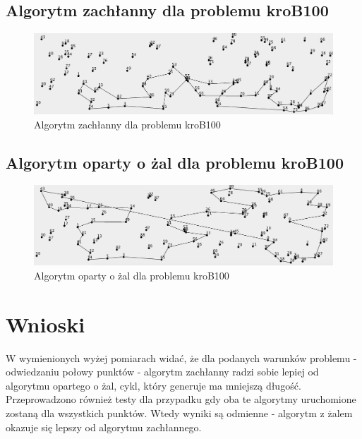 \documentclass[a4paper]{article}
\begin{document}
\subsection{Algorytm zachłanny dla problemu kroB100}

\begin{figure}[H]
\centering
\includegraphics[width=\textwidth]{kroB_greedy}
\caption{Algorytm zachłanny dla problemu kroB100}
\end{figure}

\subsection{Algorytm oparty o żal dla problemu kroB100}

\begin{figure}[H]
\centering
\includegraphics[width=\textwidth]{kroB_regret}
\caption{Algorytm oparty o żal dla problemu kroB100}
\end{figure}

\section{Wnioski}

W wymienionych wyżej pomiarach widać, że dla podanych warunków problemu -  odwiedzaniu połowy punktów - algorytm zachłanny radzi sobie lepiej od algorytmu opartego o żal, cykl, który generuje ma mniejszą długość. Przeprowadzono również testy dla przypadku gdy oba te algorytmy uruchomione zostaną dla wszystkich punktów. Wtedy wyniki są odmienne - algorytm z żalem okazuje się lepszy od algorytmu zachłannego.
\end{document}
